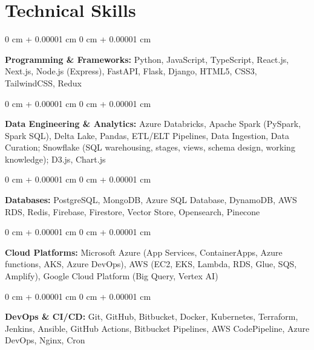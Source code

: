 \documentclass[10pt, letterpaper]{article}
\newenvironment{onecolentry}{
    \begin{adjustwidth}{
        0 cm + 0.00001 cm
    }{
        0 cm + 0.00001 cm
    }
}{
    \end{adjustwidth}
} %
\begin{document}



\section{Technical Skills}

\begin{onecolentry}
	\textbf{Programming \& Frameworks:} Python, JavaScript, TypeScript, React.js, Next.js, Node.js (Express), FastAPI, Flask, Django, HTML5, CSS3, TailwindCSS, Redux
\end{onecolentry}

\begin{onecolentry}
	\textbf{Data Engineering \& Analytics:} Azure Databricks, Apache Spark (PySpark, Spark SQL), Delta Lake, Pandas, ETL/ELT Pipelines, Data Ingestion, Data Curation; Snowflake (SQL warehousing, stages, views, schema design, working knowledge); D3.js, Chart.js
\end{onecolentry}

\begin{onecolentry}
	\textbf{Databases:} PostgreSQL, MongoDB, Azure SQL Database, DynamoDB, AWS RDS, Redis, Firebase, Firestore, Vector Store, Opensearch, Pinecone
\end{onecolentry}

\begin{onecolentry}
	\textbf{Cloud Platforms:} Microsoft Azure (App Services, ContainerApps, Azure functions, AKS, Azure DevOps), AWS (EC2, EKS, Lambda, RDS, Glue, SQS, Amplify), Google Cloud Platform (Big Query, Vertex AI)
\end{onecolentry}

\begin{onecolentry}
	\textbf{DevOps \& CI/CD:} Git, GitHub, Bitbucket, Docker, Kubernetes, Terraform, Jenkins, Ansible, GitHub Actions, Bitbucket Pipelines, AWS CodePipeline, Azure DevOps, Nginx, Cron
\end{onecolentry}
\end{document}
